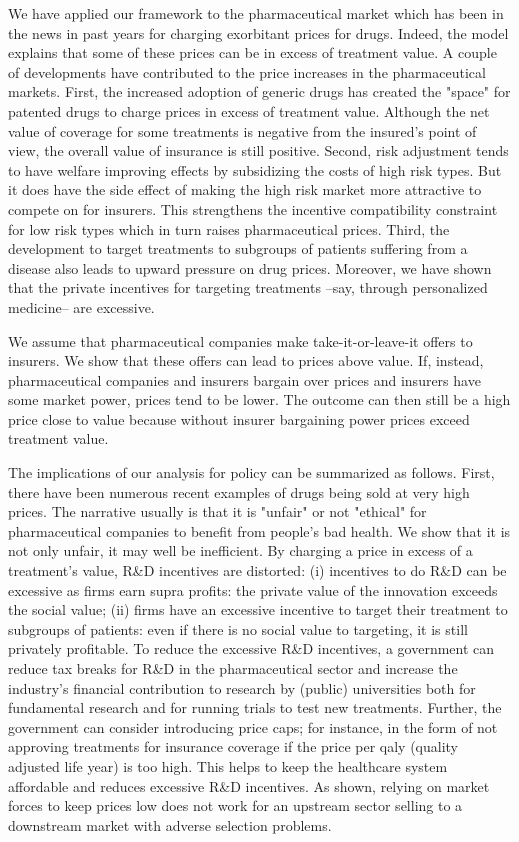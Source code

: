 \documentclass[12pt,english,a4paper]{article}
\begin{document}
We have applied our framework to the pharmaceutical market which has been in the news in past years for charging exorbitant prices for drugs. Indeed, the model explains that some of these prices can be in excess of treatment value. A couple of developments have contributed to the price increases in the pharmaceutical markets. First, the increased adoption of generic drugs has created the "space" for patented drugs to charge prices in excess of treatment value. Although the net value of coverage for some treatments is negative from the insured's point of view, the overall value of insurance is still positive. Second, risk adjustment tends to have welfare improving effects by subsidizing the costs of high risk types. But it does have the side effect of making the high risk market more attractive to compete on for insurers. This strengthens the incentive compatibility constraint for low risk types which in turn raises pharmaceutical prices. Third, the development to target treatments to subgroups of patients suffering from a disease also leads to upward pressure on drug prices. Moreover, we have shown that the private incentives for targeting treatments --say, through personalized medicine-- are excessive.

We assume that pharmaceutical companies make take-it-or-leave-it offers to insurers. We show that these offers can lead to prices above value. If, instead, pharmaceutical companies and insurers bargain over prices and insurers have some market power, prices tend to be lower. The outcome can then still be a high price close to value because without insurer bargaining power prices exceed treatment value.

The implications of our analysis for policy can be summarized as follows. First, there have been numerous recent examples of drugs being sold at very high prices. The narrative usually is that it is "unfair" or not "ethical" for pharmaceutical companies to benefit from people's bad health. We show that it is not only unfair, it may well be inefficient. By charging a price in excess of a treatment's value, R\&D incentives are distorted: (i) incentives to do R\&D can be excessive as firms earn supra profits: the private value of the innovation exceeds the social value; (ii) firms have an excessive incentive to target their treatment to subgroups of patients: even if there is no social value to targeting, it is still privately profitable. To reduce the excessive R\&D incentives, a government can reduce tax breaks for R\&D in the pharmaceutical sector and increase the industry's financial contribution to research by (public) universities both for fundamental research and for running trials to test new treatments. Further, the government can consider introducing price caps; for instance, in the form of not approving treatments for insurance coverage if the price per qaly (quality adjusted life year) is too high. This helps to keep the healthcare system affordable and reduces excessive R\&D incentives. As shown, relying on market forces to keep prices low does not work for an upstream sector selling to a downstream market with adverse selection problems.
\end{document}
